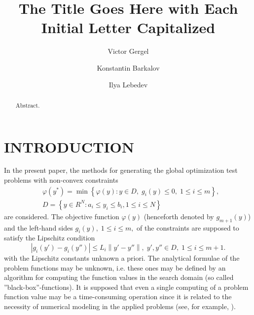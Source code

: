 \documentclass{aip-cp}
\begin{document}
\title{The Title Goes Here with Each Initial Letter Capitalized}

\author{Victor Gergel}
\author{Konstantin Barkalov}
\author{Ilya Lebedev}


\maketitle


\begin{abstract}
Abstract.
\end{abstract}

\section{INTRODUCTION}

In the present paper, the methods for generating the global optimization test problems with non-convex constraints
\begin{eqnarray}
&\varphi(y^\ast)=\min{\left\{\varphi(y):y\in D, \; g_i(y)\leq 0, \; 1 \leq i \leq m\right\}}, \label{i_problem} \\
&D=\left\{y\in R^N: a_i\leq y_i \leq b_i, 1\leq i \leq N\right\} \label{D}
\end{eqnarray}
are considered. The objective function $\varphi(y)$ (henceforth denoted by $g_{m+1}(y)$) and the left-hand sides $g_i(y), \; 1\leq i \leq m,$ of the constraints are supposed to satisfy the Lipschitz condition
\[ \left|g_i(y')-g_i (y'')\right| \leq L_i \left\|y'-y'' \right\|, \; y',y''\in D, \; 1\leq i \leq m+1. \]
with the Lipschitz constants unknown a priori. The analytical formulae of the problem functions may be unknown, i.e. these ones may be defined by an algorithm for computing the function values in the search domain (so called ''black-box''-functions). It is supposed that even a single computing of a problem function value may be a time-consuming operation since it is related to the necessity of numerical modeling in the applied problems (see, for example, \cite{Famularo1999,Menniti2008}).
\end{document}
